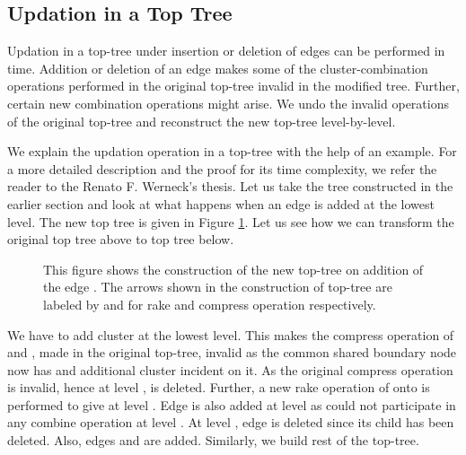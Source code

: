 \documentclass[a4paper,12pt]{article}
\begin{document}
\subsection{Updation in a Top Tree}
Updation in a top-tree under insertion or deletion of edges can be performed in  time. Addition or deletion of an edge makes some of the cluster-combination operations performed in the original top-tree invalid in the modified tree. Further, certain new combination operations might arise. We undo the invalid operations of the original top-tree and reconstruct the new top-tree level-by-level.

We explain the updation operation in a top-tree with the help of an example. For a more detailed description and the proof for its time complexity, we refer the reader to the Renato F. Werneck's thesis\cite{werneck}. Let us take the tree constructed in the earlier section and look at what happens when an edge  is added at the lowest level. The new top tree is given in Figure \ref{fig:top-tree-updation}. Let us see how we can transform the original top tree above to top tree below.

\begin{figure}
\caption{This figure shows the construction of the new top-tree on addition of the edge . The arrows shown in the construction of top-tree are labeled by  and  for rake and compress operation respectively.}
\label{fig:top-tree-updation}
\end{figure}

We have to add cluster  at the lowest level. This makes the compress operation of  and , made in the original top-tree, invalid as the common shared boundary node  now has and additional cluster  incident on it. As the original compress operation is invalid, hence at level ,  is deleted. Further, a new rake operation of  onto  is performed to give  at level . Edge  is also added at level  as  could not participate in any combine operation at level . At level , edge  is deleted since its child  has been deleted. Also, edges  and  are added. Similarly, we build rest of the top-tree.
\end{document}
